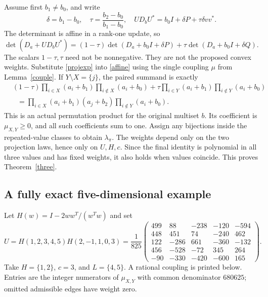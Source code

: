 \documentclass[11pt]{article}
\begin{document}
Assume first $b_1\ne b_0$, and write
\[
\delta=b_1-b_0,\quad \tau=\frac{b_2-b_0}{b_1-b_0},\quad
UD_bU^*=b_0I+\delta P+\tau\delta vv^*.
\]
The determinant is affine in a rank-one update, so
\begin{equation}\label{affine}
\det(D_a+UD_bU^*)=(1-\tau)\det(D_a+b_0I+\delta P)
+\tau\det(D_a+b_0I+\delta Q).
\end{equation}
The scalars $1-\tau,\tau$ need not be nonnegative. They are not the proposed convex weights. Substitute \eqref{projexp} into \eqref{affine} using the single coupling $\mu$ from Lemma~\ref{couple}. If $Y\setminus X=\{j\}$, the paired summand is exactly
\begin{align*}
&(1-\tau)\prod_{i\in X}(a_i+b_1)\prod_{i\notin X}(a_i+b_0)
+\tau\prod_{i\in Y}(a_i+b_1)\prod_{i\notin Y}(a_i+b_0)\\
&\hspace{8pt}=\prod_{i\in X}(a_i+b_1)(a_j+b_2)\prod_{i\notin Y}(a_i+b_0).
\end{align*}
This is an actual permutation product for the original multiset $b$. Its coefficient is $\mu_{X,Y}\ge0$, and all such coefficients sum to one. Assign any bijections inside the repeated-value classes to obtain $\lambda_\pi$. The weights depend only on the two projection laws, hence only on $U,H,c$. Since the final identity is polynomial in all three values and has fixed weights, it also holds when values coincide. This proves Theorem~\ref{three}.

\subsection{A fully exact five-dimensional example}
Let $H(w)=I-2ww^T/(w^Tw)$ and set
\[
U=H(1,2,3,4,5)H(2,-1,1,0,3)
=\frac1{825}\begin{pmatrix}
499&88&-238&-120&-594\\448&451&74&-240&462\\
122&-286&661&-360&-132\\456&-528&-72&345&264\\
-90&-330&-420&-600&165
\end{pmatrix}.
\]
Take $H=\{1,2\}$, $c=3$, and $L=\{4,5\}$. A rational coupling is printed below. Entries are the integer numerators of $\mu_{X,Y}$ with common denominator $680625$; omitted admissible edges have weight zero.
\end{document}

